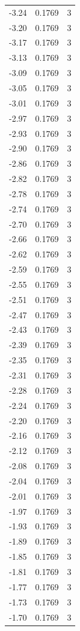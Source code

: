 \begin{longtable}{lrr}
  -3.24 & 0.1769 & 3 \\
  -3.20 & 0.1769 & 3 \\
  -3.17 & 0.1769 & 3 \\
  -3.13 & 0.1769 & 3 \\
  -3.09 & 0.1769 & 3 \\
  -3.05 & 0.1769 & 3 \\
  -3.01 & 0.1769 & 3 \\
  -2.97 & 0.1769 & 3 \\
  -2.93 & 0.1769 & 3 \\
  -2.90 & 0.1769 & 3 \\
  -2.86 & 0.1769 & 3 \\
  -2.82 & 0.1769 & 3 \\
  -2.78 & 0.1769 & 3 \\
  -2.74 & 0.1769 & 3 \\
  -2.70 & 0.1769 & 3 \\
  -2.66 & 0.1769 & 3 \\
  -2.62 & 0.1769 & 3 \\
  -2.59 & 0.1769 & 3 \\
  -2.55 & 0.1769 & 3 \\
  -2.51 & 0.1769 & 3 \\
  -2.47 & 0.1769 & 3 \\
  -2.43 & 0.1769 & 3 \\
  -2.39 & 0.1769 & 3 \\
  -2.35 & 0.1769 & 3 \\
  -2.31 & 0.1769 & 3 \\
  -2.28 & 0.1769 & 3 \\
  -2.24 & 0.1769 & 3 \\
  -2.20 & 0.1769 & 3 \\
  -2.16 & 0.1769 & 3 \\
  -2.12 & 0.1769 & 3 \\
  -2.08 & 0.1769 & 3 \\
  -2.04 & 0.1769 & 3 \\
  -2.01 & 0.1769 & 3 \\
  -1.97 & 0.1769 & 3 \\
  -1.93 & 0.1769 & 3 \\
  -1.89 & 0.1769 & 3 \\
  -1.85 & 0.1769 & 3 \\
  -1.81 & 0.1769 & 3 \\
  -1.77 & 0.1769 & 3 \\
  -1.73 & 0.1769 & 3 \\
  -1.70 & 0.1769 & 3 \\

\end{longtable}
